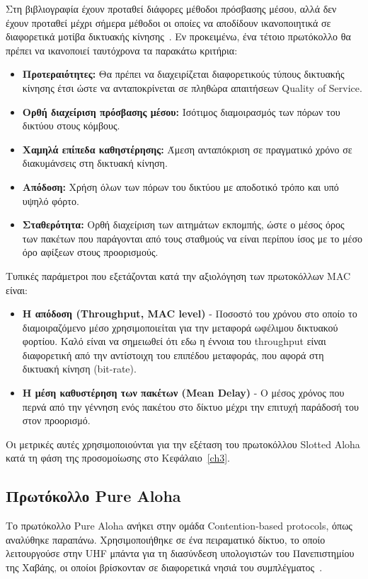 \documentclass[12pt]{report}
\begin{document}
Στη βιβλιογραφία έχουν προταθεί διάφορες μέθοδοι πρόσβασης μέσου, αλλά δεν έχουν προταθεί μέχρι σήμερα μέθοδοι οι οποίες να αποδίδουν ικανοποιητικά σε διαφορετικά μοτίβα δικτυακής κίνησης~\cite{book:01}. Εν προκειμένω, ένα τέτοιο πρωτόκολλο θα πρέπει να ικανοποιεί ταυτόχρονα τα παρακάτω κριτήρια:
\begin{itemize}
  \item  \textbf{Προτεραιότητες:} Θα πρέπει να διαχειρίζεται διαφορετικούς τύπους δικτυακής κίνησης έτσι ώστε να ανταποκρίνεται σε πληθώρα απαιτήσεων \textlatin{Quality of Service}.
  \item \textbf{Ορθή διαχείριση πρόσβασης μέσου:} Ισότιμος διαμοιρασμός των πόρων του δικτύου στους κόμβους.
  \item \textbf{Χαμηλά επίπεδα καθηστέρησης:} Άμεση ανταπόκριση σε πραγματικό χρόνο σε διακυμάνσεις στη δικτυακή κίνηση.
  \item \textbf{Απόδοση:} Χρήση όλων των πόρων του δικτύου με αποδοτικό τρόπο και υπό υψηλό φόρτο.
  \item \textbf{Σταθερότητα:} Ορθή διαχείριση των αιτημάτων εκπομπής, ώστε ο μέσος όρος των πακέτων που παράγονται από τους σταθμούς να είναι περίπου ίσος με το μέσο όρο αφίξεων στους προορισμούς.
\end{itemize}

Τυπικές παράμετροι που εξετάζονται κατά την αξιολόγηση των πρωτοκόλλων \textlatin{MAC} είναι:
\begin{itemize}
  \item \textbf{Η απόδοση (\textlatin{Throughput, MAC level})} - Ποσοστό του χρόνου στο οποίο το διαμοιραζόμενο μέσο χρησιμοποιείται για την μεταφορά ωφέλιμου δικτυακού φορτίου. Καλό είναι να σημειωθεί ότι εδω η έννοια του \textlatin{throughput} είναι διαφορετική από την αντίστοιχη του επιπέδου μεταφοράς, που αφορά στη δικτυακή κίνηση (\textlatin{bit-rate}).
  \item \textbf{Η μέση καθυστέρηση των πακέτων (\textlatin{Mean Delay})} - Ο μέσος χρόνος που περνά από την γέννηση ενός πακέτου στο δίκτυο μέχρι την επιτυχή παράδοσή του στον προορισμό.
\end{itemize}
Οι μετρικές αυτές χρησιμοποιούνται για την εξέταση του πρωτοκόλλου \textlatin{Slotted Aloha} κατά τη φάση της προσομοίωσης στο Κεφάλαιο~\ref{ch3}.

\subsection{Πρωτόκολλο \textlatin{Pure Aloha}}
Το πρωτόκολλο \textlatin{Pure Aloha} ανήκει στην ομάδα \textlatin{Contention-based protocols}, όπως αναλύθηκε παραπάνω. Χρησιμοποιήθηκε σε ένα πειραματικό δίκτυο, το οποίο λειτουργούσε στην \textlatin{UHF} μπάντα για τη διασύνδεση υπολογιστών του Πανεπιστημίου της Χαβάης, οι οποίοι βρίσκονταν σε διαφορετικά νησιά του συμπλέγματος~\cite{book:02}.
\end{document}
